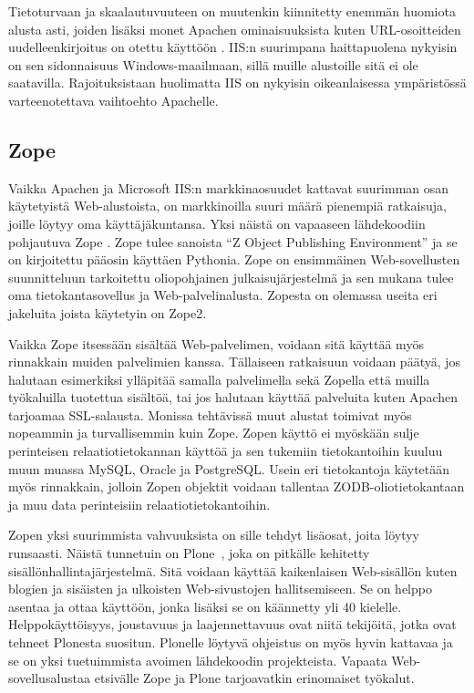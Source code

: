 Tietoturvaan ja skaalautuvuuteen on muutenkin kiinnitetty enemmän huomiota alusta asti, joiden lisäksi monet Apachen ominaisuuksista
kuten URL-osoitteiden uudelleenkirjoitus on otettu käyttöön \cite{IIS}. IIS:n suurimpana haittapuolena nykyisin on sen sidonnaisuus Windows-maailmaan, sillä muille alustoille sitä ei ole 
saatavilla. Rajoituksistaan huolimatta IIS on nykyisin oikeanlaisessa ympäristössä varteenotettava vaihtoehto Apachelle. 

\subsection{Zope}

Vaikka Apachen ja Microsoft IIS:n markkinaosuudet kattavat suurimman osan käytetyistä Web-alustoista, on markkinoilla suuri määrä pienempiä ratkaisuja, joille löytyy oma käyttäjäkuntansa. Yksi 
näistä on vapaaseen lähdekoodiin pohjautuva Zope \cite{Zope}. Zope tulee sanoista ``Z Object Publishing Environment'' ja se on kirjoitettu pääosin käyttäen Pythonia. Zope on ensimmäinen
Web-sovellusten suunnitteluun tarkoitettu oliopohjainen julkaisujärjestelmä ja sen mukana tulee oma tietokantasovellus ja Web-palvelinalusta. Zopesta on olemassa useita eri jakeluita
joista käytetyin on Zope2. 

Vaikka Zope itsessään sisältää Web-palvelimen, voidaan sitä käyttää myös rinnakkain muiden palvelimien kanssa. Tällaiseen ratkaisuun voidaan päätyä, jos halutaan esimerkiksi ylläpitää samalla
palvelimella sekä Zopella että muilla työkaluilla tuotettua sisältöä,
tai jos halutaan käyttää palveluita kuten Apachen tarjoamaa SSL-salausta. Monissa tehtävissä muut alustat toimivat myös nopeammin ja 
turvallisemmin kuin Zope. Zopen käyttö ei myöskään sulje perinteisen
relaatiotietokannan käyttöä ja sen tukemiin tietokantoihin kuuluu
muun muassa MySQL, Oracle ja PostgreSQL. Usein eri 
tietokantoja käytetään myös rinnakkain, jolloin Zopen objektit voidaan tallentaa ZODB-oliotietokantaan ja muu data perinteisiin relaatiotietokantoihin. 

Zopen yksi suurimmista vahvuuksista on sille tehdyt lisäosat, joita löytyy runsaasti. Näistä tunnetuin on Plone~\cite{Plone}, joka on pitkälle kehitetty 
sisällönhallintajärjestelmä. Sitä voidaan käyttää kaikenlaisen Web-sisällön kuten blogien ja sisäisten ja ulkoisten Web-sivustojen hallitsemiseen. Se on helppo asentaa ja ottaa käyttöön, 
jonka lisäksi se on käännetty yli 40 kielelle. Helppokäyttöisyys, joustavuus ja laajennettavuus ovat niitä tekijöitä, jotka ovat tehneet Plonesta suositun. Plonelle löytyvä ohjeistus
on myös hyvin kattavaa ja se on yksi tuetuimmista avoimen lähdekoodin projekteista. Vapaata Web-sovellusalustaa etsivälle Zope ja Plone tarjoavatkin erinomaiset työkalut.

